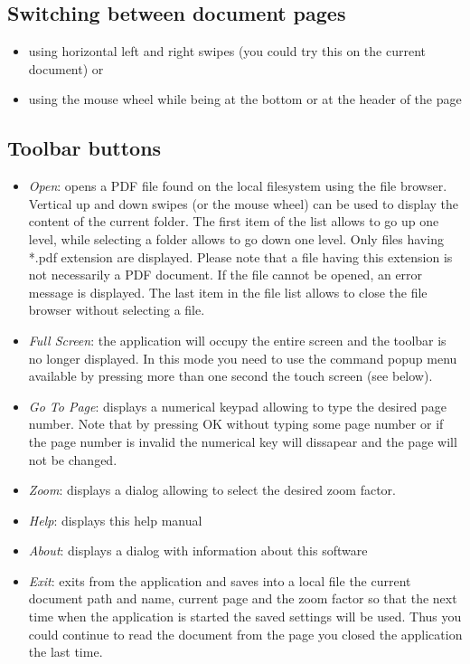 \documentclass[journal,12pt]{IEEEtran}
\begin{document}
\subsection{Switching between document pages}
\begin{itemize}
 \item using horizontal left and right swipes (you could try this on the current document) or
 \item using the mouse wheel while being at the bottom or at the header of the page
\end{itemize}

\subsection{Toolbar buttons}
\begin{itemize}
 \item \textit{Open}: opens a PDF file found on the local filesystem using the file browser. Vertical up and down swipes (or the mouse wheel) can be used to display the content of the current folder. The first item of the list allows to go up one level, while selecting a folder allows to go down one level. Only files having *.pdf extension are displayed. Please note that a file having this extension is not necessarily a PDF document. If the file cannot be opened, an error message is displayed. The last item in the file list allows to close the file browser without selecting a file.
 \item \textit{Full Screen}: the application will occupy the entire screen and the toolbar is no longer displayed. In this mode you need to use the command popup menu available by pressing more than one second the touch screen (see below).
 \item \textit{Go To Page}: displays a numerical keypad allowing to type the desired page number. Note that by pressing OK without typing some page number or if the page number is invalid the numerical key will dissapear and the page will not be changed.
 \item \textit{Zoom}: displays a dialog allowing to select the desired zoom factor.
 \item \textit{Help}: displays this help manual
 \item \textit{About}: displays a dialog with information about this software
 \item \textit{Exit}: exits from the application and saves into a local file the current document path and name, current page and the  zoom factor so that the next time when the application is started the saved settings will be used. Thus you could continue to read the document from the page you closed the application the last time.
\end{itemize}
\end{document}
